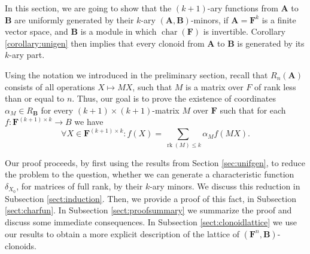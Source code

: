 \documentclass[11pt]{amsart}
\theoremstyle{plain}
\theoremstyle{definition}
\newcommand{\F}{{\mathbf F}}
\newcommand{\alg}[1]{\mathbf{#1}}
\newcommand{\algA}{\alg{A}}
\newcommand{\algB}{\alg{B}}
\DeclareMathOperator{\rk}{rk}
\DeclareMathOperator{\chars}{char}
\begin{document}
In this section, we are going to show that the $(k+1)$-ary functions from $\algA$ to $\algB$ are uniformly generated by their $k$-ary $(\algA, \algB)$-minors, if $\algA = \F^k$ is a finite vector space, and $\algB$ is a module in which $\chars(\F)$ is invertible. Corollary \ref{corollary:unigen} then implies that every clonoid from $\algA$ to $\algB$ is generated by its $k$-ary part.

Using the notation we introduced in the preliminary section, recall that $R_n(\algA)$ consists of all operations $X \mapsto MX$, such that $M$ is a matrix over $F$ of rank less than or equal to $n$. Thus, our goal is to prove the existence of coordinates $\alpha_M \in R_\mathbf{B}$ for every $(k+1)\times (k+1)$-matrix $M$ 
over $\F$ such that for each 
$f\colon \F^{(k+1) \times k} \to B$ we have 
\[
\forall X\in \F^{(k+1) \times k}\colon f(X)=
\sum_{\rk(M) \leq k} \alpha_M f(MX).
\]

Our proof proceeds, by first using the results from Section \ref{sec:unifgen}, to reduce the problem to the question, whether we can generate a characteristic function $\delta_{X_0}$, for matrices of full rank, by their $k$-ary minors. We discuss this reduction in Subsection \ref{sect:induction}. Then, we provide a proof of this fact, in Subsection \ref{sect:charfun}. In Subsection \ref{sect:proofsummary} we summarize the proof and discuss some immediate consequences. In Subsection \ref{sect:clonoidlattice} we use our results to obtain a more explicit description of the lattice of $(\F^n,\algB)$-clonoids. 
\end{document}
